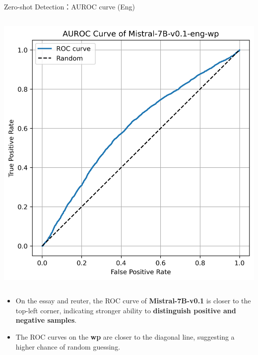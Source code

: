 \documentclass[serif]{beamer}
\begin{document}
\begin{frame}{Zero-shot Detection：AUROC curve (Eng)}
\begin{columns}[t]
    \centering
    \includegraphics[width=\linewidth]{images/Mistral-7B-v0.1-eng-wp.png}
\end{columns}
\begin{itemize}
  \item On the essay and reuter, the ROC curve of \textbf{Mistral-7B-v0.1} is closer to the top-left corner, indicating stronger ability to \textbf{distinguish positive and negative samples}.
  \item The ROC curves on the\textbf{ wp} are closer to the diagonal line, suggesting a higher chance of random guessing.
\end{itemize}

\end{frame}
\end{document}
